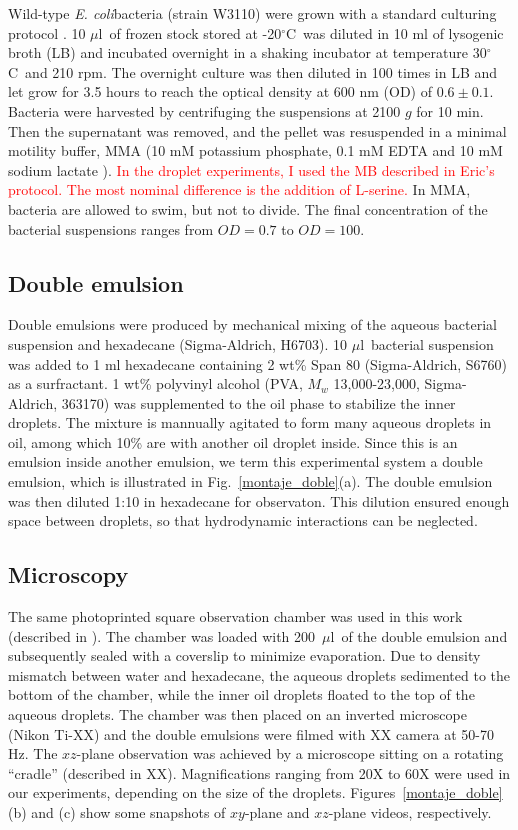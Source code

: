 \documentclass[%
10pt,
superscriptaddress,
twocolumn,
 amsmath,amssymb,
 aps,prx,
]{revtex4-2}
\newcommand{\ecoli}[0]{\textit{E. coli}} %
\newcommand{\degreec}[0]{$^\circ$C}
\newcommand{\ul}[0]{$\mu$l}
\begin{document}
Wild-type \ecoli bacteria (strain  W3110) were grown with a standard culturing protocol \cite{Keymer2008}.
10 \ul~of frozen stock stored at -20\degreec~was diluted in 10 ml of lysogenic broth (LB) and incubated overnight in a shaking incubator at temperature 30\degreec~and 210 rpm. 
The overnight culture was then diluted in 100 times in LB and let grow for 3.5 hours to reach the optical density at 600 nm (OD) of $0.6\pm 0.1$. 
Bacteria were harvested by centrifuging the suspensions at 2100 $g$ for 10 min. 
Then the supernatant was removed, and the pellet was resuspended in a minimal motility buffer, MMA (10 mM potassium phosphate, 0.1 mM EDTA and 10 mM sodium lactate \cite{Minamino2003}).
\textcolor{red}{In the droplet experiments, I used the MB described in Eric's protocol. The most nominal difference is the addition of L-serine.} 
In MMA, bacteria are allowed to swim, but not to divide. 
The final concentration of the bacterial suspensions ranges from $OD = 0.7$ to $OD = 100$.
\subsection{Double emulsion}

Double emulsions were produced by mechanical mixing of the aqueous bacterial suspension and hexadecane (Sigma-Aldrich, H6703).
10 \ul~bacterial suspension was added to 1 ml hexadecane containing 2 wt\% Span 80 (Sigma-Aldrich, S6760) as a surfractant. 
1 wt\% polyvinyl alcohol (PVA, $M_w$ 13,000-23,000, Sigma-Aldrich, 363170) was supplemented to the oil phase to stabilize the inner droplets.
The mixture is mannually agitated to form many aqueous droplets in oil, among which 10\% are with another oil droplet inside.
Since this is an emulsion inside another emulsion, we term this experimental system a double emulsion, which is illustrated in Fig.~\ref{montaje_doble}(a).
The double emulsion was then diluted 1:10 in hexadecane for observaton.
This dilution ensured enough space between droplets, so that hydrodynamic interactions can be neglected. 

\subsection{Microscopy}

The same photoprinted square observation chamber was used in this work (described in \citet{Ramos2020}).
The chamber was loaded with 200~\ul~of the double emulsion and subsequently sealed with a coverslip to minimize evaporation.
Due to density mismatch between water and hexadecane, the aqueous droplets sedimented to the bottom of the chamber, while the inner oil droplets floated to the top of the aqueous droplets.  
The chamber was then placed on an inverted microscope (Nikon Ti-XX) and the double emulsions were filmed with XX camera at 50-70 Hz.
The $xz$-plane observation was achieved by a microscope sitting on a rotating ``cradle'' (described in XX). 
Magnifications ranging from 20X to 60X were used in our experiments, depending on the size of the droplets. 
Figures~\ref{montaje_doble}(b) and (c) show some snapshots of $xy$-plane and $xz$-plane videos, respectively. 
\end{document}
